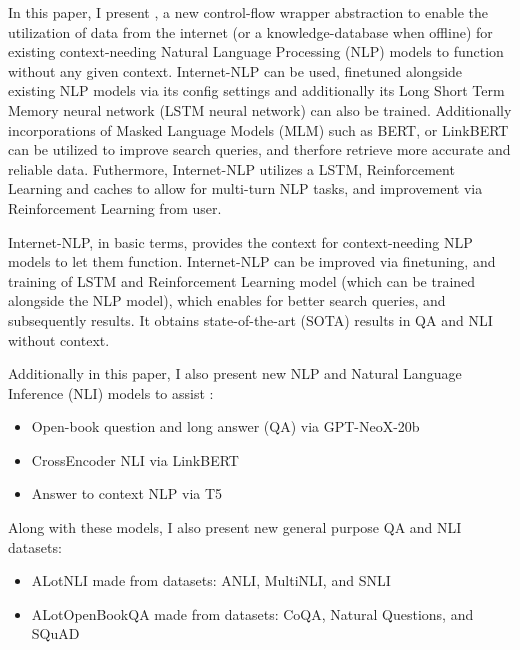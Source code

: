 In this paper, I present {\bf \inlp}, a new control-flow wrapper abstraction to enable the utilization of data from the internet (or a knowledge-database when offline) for existing context-needing Natural Language Processing (NLP) models to function without any given context. Internet-NLP can be used, finetuned alongside existing NLP models via its config settings and additionally its Long Short Term Memory neural network (LSTM neural network) can also be trained. Additionally incorporations of Masked Language Models (MLM) such as BERT, or LinkBERT \cite{devlin-etal-2019-bert,yasunaga-etal-2022-linkbert} can be utilized to improve search queries, and therfore retrieve more accurate and reliable data. Futhermore, Internet-NLP utilizes a LSTM, Reinforcement Learning and caches to allow for multi-turn NLP tasks, and improvement via Reinforcement Learning from user.

Internet-NLP, in basic terms, provides the context for context-needing NLP models to let them function. Internet-NLP can be improved via finetuning, and training of LSTM and Reinforcement Learning model (which can be trained alongside the NLP model), which enables for better search queries, and subsequently results. It obtains state-of-the-art (SOTA) results in QA and NLI without context.

Additionally in this paper, I also present new NLP and Natural Language Inference (NLI) models to assist {\bf \inlp}:

\begin{itemize}
    \item Open-book question and long answer (QA) via GPT-NeoX-20b \cite{gpt-neox-library, gpt-neox-20b}
    \item CrossEncoder NLI via LinkBERT \cite{reimers-2019-sentence-bert,thakur-2020-AugSBERT, yasunaga-etal-2022-linkbert}
    \item Answer to context NLP via T5 \cite{https://doi.org/10.48550/arxiv.1910.10683}
\end{itemize}

Along with these models, I also present new general purpose QA and NLI datasets:

\begin{itemize}
    \item ALotNLI made from datasets: ANLI, MultiNLI, and SNLI \cite{nie-etal-2020-adversarial,N18-1101,DBLP:journals/corr/BowmanAPM15}
    \item ALotOpenBookQA made from datasets: CoQA, Natural Questions, and SQuAD \cite{DBLP:journals/corr/abs-1808-07042,kwiatkowski-etal-2019-natural,DBLP:journals/corr/abs-1806-03822}
\end{itemize}

